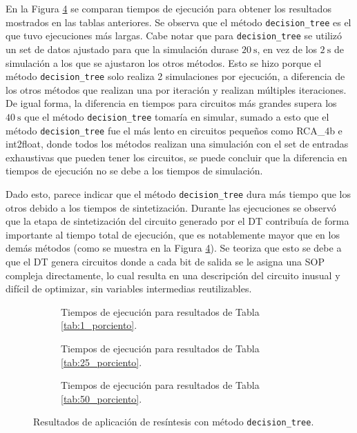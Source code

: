 En la Figura \ref{fig:comparacion_tiempos} se comparan
tiempos de ejecución para obtener los resultados mostrados en las tablas
anteriores. Se observa que el método \texttt{decision\_tree} es el que tuvo
ejecuciones más largas. Cabe notar que para \texttt{decision\_tree} se utilizó
un set de datos ajustado para que la simulación durase $\SI{20}{\second}$, en
vez de los $\SI{2}{\second}$ de simulación a los que se ajustaron los otros
métodos. Esto se hizo porque el método \texttt{decision\_tree} solo realiza 2
simulaciones por ejecución, a diferencia de los otros métodos que realizan una
por iteración y realizan múltiples iteraciones. De igual forma, la diferencia
en tiempos para circuitos más grandes supera los $\SI{40}{\second}$ que el
método \texttt{decision\_tree} tomaría en simular, sumado a esto que el método
\texttt{decision\_tree} fue el más lento en circuitos pequeños como RCA\_4b e
int2float, donde todos los métodos realizan una simulación con el set de
entradas exhaustivas que pueden tener los circuitos, se puede concluir que la
diferencia en tiempos de ejecución no se debe a los tiempos de simulación.

Dado esto, parece indicar que el método \texttt{decision\_tree} dura más tiempo
que los otros debido a los tiempos de sintetización. Durante las ejecuciones se
observó que la etapa de sintetización del circuito generado por el DT
contribuía de forma importante al tiempo total de ejecución, que es
notablemente mayor que en los demás métodos (como se muestra en la Figura
\ref{fig:comparacion_tiempos}). Se teoriza que esto se debe a que el DT genera
circuitos donde a cada bit de salida se le asigna una SOP compleja
directamente, lo cual resulta en una descripción del circuito inusual y difícil
de optimizar, sin variables intermedias reutilizables.

\begin{figure}
  \centering
  \begin{subfigure}{0.75\textwidth}
    \centering
    
    \caption{Tiempos de ejecución para resultados de Tabla \ref{tab:1_porciento}.}
    \label{fig:01_tiempo}
  \end{subfigure}
  \begin{subfigure}{0.75\textwidth}
    \centering
    
    \caption{Tiempos de ejecución para resultados de Tabla \ref{tab:25_porciento}.}
    \label{fig:25_tiempo}
  \end{subfigure}
  \begin{subfigure}{0.75\textwidth}
    \centering
    
    \caption{Tiempos de ejecución para resultados de Tabla \ref{tab:50_porciento}.}
    \label{fig:50_tiempo}
  \end{subfigure}
  \caption{Resultados de aplicación de resíntesis con método \texttt{decision\_tree}.}
  \label{fig:comparacion_tiempos}
\end{figure}

